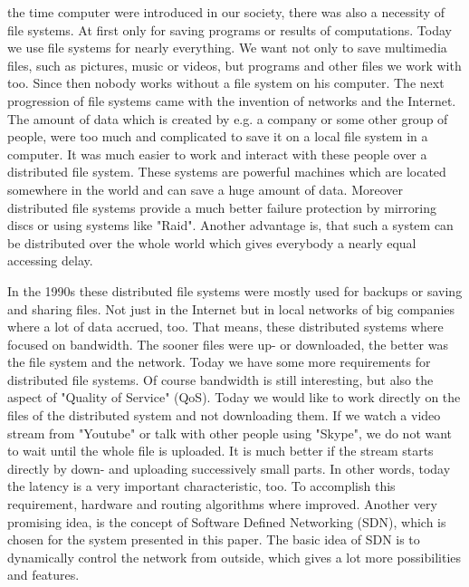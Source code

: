  the time computer were introduced in our society, there was also a necessity of file systems. At first only for saving programs or results of computations. Today we use file systems for nearly everything. We want not only to save multimedia files, such as pictures, music or videos, but programs and other files we work with too. Since then nobody works without a file system on his computer. The next progression of file systems came with the invention of networks and the Internet. The amount of data which is created by e.g. a company or some other group of people, were too much and complicated to save it on a local file system in a computer. It was much easier to work and interact with these people over a distributed file system. These systems are powerful machines which are located somewhere in the world and can save a huge amount of data. Moreover distributed file systems provide a much better failure protection by mirroring discs or using systems like "Raid". Another advantage is, that such a system can be distributed over the whole world which gives everybody a nearly equal accessing delay.

In the 1990s these distributed file systems were mostly used for backups or saving and sharing files. Not just in the Internet but in local networks of big companies where a lot of data accrued, too. That means, these distributed systems where focused on bandwidth. The sooner files were up- or downloaded, the better was the file system and the network. Today we have some more requirements for distributed file systems. Of course bandwidth is still interesting, but also the aspect of "Quality of Service" (QoS). Today we would like to work directly on the files of the distributed system and not downloading them. If we watch a video stream from "Youtube" or talk with other people using "Skype", we do not want to wait until the whole file is uploaded. It is much better if the stream starts directly by down- and uploading successively small parts. In other words, today the latency is a very important characteristic, too. To accomplish this requirement, hardware and routing algorithms where improved. Another very promising idea, is the concept of Software Defined Networking (SDN), which is chosen for the system presented in this paper. The basic idea of SDN is to dynamically control the network from outside, which gives a lot more possibilities and features.  


